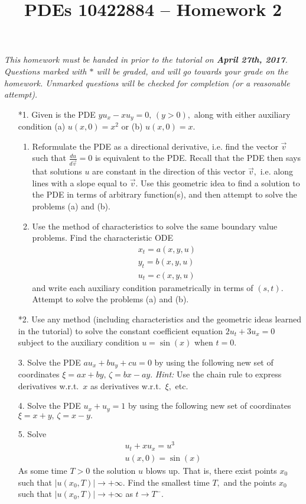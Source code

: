 \documentclass[10pt,a4paper]{article}
\title{PDEs 10422884 -- Homework 2}
\date{}
\begin{document}
\maketitle
\textsl{ This homework must be handed in prior to the tutorial on \textbf{April 27th, 2017}. Questions marked with $*$ will be graded, and will go towards your grade on the homework. Unmarked questions will be checked for completion (or a reasonable attempt).}


\begin{enumerate}

\item[*1.] Given is the PDE $y u_x - x u_y = 0, \, (y>0),$ along with either auxiliary condition (a) $u(x,0) = x^2$ or (b) $u(x,0) = x.$
\begin{enumerate}
\item Reformulate the PDE as a directional derivative, i.e. find the vector $\vec{v}$ such that $\frac{du}{d \vec{v}} = 0$ is equivalent to the PDE. Recall that the PDE then says that solutions $u$ are constant in the direction of this vector $\vec{v},$ i.e. along lines with a slope equal to $\vec{v}.$ Use this geometric idea to find a solution to the PDE in terms of arbitrary function(s), and then attempt to solve the problems (a) and (b).
\item Use the method of characteristics to solve the same boundary value problems. Find the characteristic ODE
\begin{align*}
x_t = a(x,y,u)\\
y_t = b(x,y,u)\\
u_t = c(x,y,u)
\end{align*}
and write each auxiliary condition parametrically in terms of $(s,t).$ Attempt to solve the problems (a) and (b).
\end{enumerate}  

\item[*2.] Use any method (including characteristics and the geometric ideas learned in the tutorial) to solve the constant coefficient equation $2u_t + 3u_x = 0$ subject to the auxiliary condition $u = \sin(x)$ when $t = 0.$

\item[3.] Solve the PDE $a u_x + b u_y + cu = 0$ by using the following new set of coordinates $\xi = ax + by, \, \zeta = bx - ay.$ \emph{Hint:} Use the chain rule to express derivatives w.r.t.\ $x$ as derivatives w.r.t.\ $\xi,$ etc.
\item[4.] Solve the PDE $u_x + u_y = 1$ by using the following new set of coordinates $\xi = x + y, \, \zeta = x - y.$

\item[5.] Solve 
\begin{align*}
& u_t + x u_x = u^3 \\
& u(x,0) = \sin(x)
\end{align*}
As some time $T>0$ the solution $u$ blows up. That is, there exist points $x_0$ such that $|u(x_0,T)| \rightarrow + \infty.$ Find the smallest time $T,$ and the points $x_0$ such that $|u(x_0,T)| \rightarrow + \infty$ as $t \rightarrow T^-.$
\end{enumerate}
\end{document}
